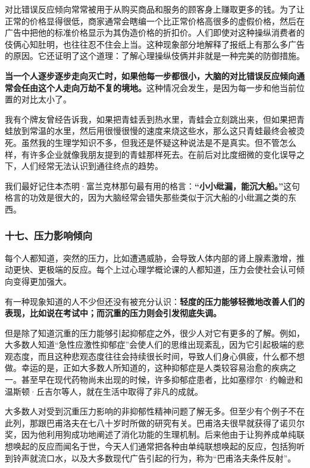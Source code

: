 对比错误反应倾向常常被用于从购买商品和服务的顾客身上赚取更多的钱。为了让正常的价格显得很低，商家通常会瞎编一个比正常价格高很多的虚假价格，然后在广告中把他的标准价格显示为其伪造价格的折扣价。人们即使对这种操纵消费者的伎俩心知肚明，也往往忍不住会上当。这种现象部分地解释了报纸上有那么多广告的原因。它还证明了这个道理：了解心理操纵伎俩并非就是一种完美的防御措施。
\par

\textbf{当一个人逐步逐步走向灭亡时，如果他每一步都很小，大脑的对比错误反应倾向通常会任由这个人走向万劫不复的境地。}这种情况会发生，是因为每一步和他当前位置的对比太小了。
\par

我有个牌友曾经告诉我，如果把青蛙丢到热水里，青蛙会立刻跳出来，但如果把青蛙放到常温的水里，然后用很慢很慢的速度来烧这些水，那么这只青蛙最终会被烫死。虽然我的生理学知识不多，但我还是怀疑这种说法是不是真实。但不管怎么样，有许多企业就像我朋友提到的青蛙那样死去。在前后对比度细微的变化误导之下，人们经常无法认识到通往终点的趋势。
\par

我们最好记住本杰明·富兰克林那句最有用的格言：\textbf{“小小纰漏，能沉大船。”}这句格言的功效是很大的，因为大脑经常会错失那些类似于沉大船的小纰漏之类的东西。
\par

\subsubsection*{十七、压力影响倾向}

每个人都知道，突然的压力，比如遭遇威胁，会导致人体内部的肾上腺素激增，推动更快、更极端的反应。每个上过心理学概论课的人都知道，压力会使社会认可倾向变得更加强大。
\par

有一种现象知道的人不少但还没有被充分认识：\textbf{轻度的压力能够轻微地改善人们的表现，比如说在考试中；而沉重的压力则会引发彻底失调。}
\par

但是除了知道沉重的压力能够引起抑郁症之外，很少人对它有更多的了解。例如，大多数人知道“急性应激性抑郁症”会使人们的思维出现紊乱，因为它引起极端的悲观态度，而且这种悲观态度往往会持续很长时间，导致人们身心俱疲，什么都不想做。幸运的是，正如大多数人所知道的，这种抑郁症是人类较容易治愈的疾病之一。甚至早在现代药物尚未出现的时候，许多抑郁症患者，比如塞缪尔·约翰逊和温斯顿·丘吉尔等人，就在生活中取得了非凡的成就。
\par

大多数人对受到沉重压力影响的非抑郁性精神问题了解无多。但至少有个例子不在此列，那跟巴甫洛夫在七八十岁时所做的研究有关。巴甫洛夫很早就获得了诺贝尔奖，因为他利用狗成功地阐述了消化功能的生理机制。后来他由于让狗养成单纯联想唤起的反应而闻名于世，今天人们通常把各种由单纯联想唤起的反应，包括狗听到铃声就流口水，以及大多数现代广告引起的行为，称为“巴甫洛夫条件反射”。
\par

